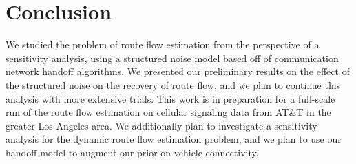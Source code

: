 
\section{Conclusion}
We studied the problem of route flow estimation from the perspective of a sensitivity analysis, using a structured noise model based off of communication network handoff algorithms. We presented our preliminary results on the effect of the structured noise on the recovery of route flow, and we plan to continue this analysis with more extensive trials. This work is in preparation for a full-scale run of the route flow estimation on cellular signaling data from AT\&T in the greater Los Angeles area. We additionally plan to investigate a sensitivity analysis for the dynamic route flow estimation problem, and we plan to use our handoff model to augment our prior on vehicle connectivity.

